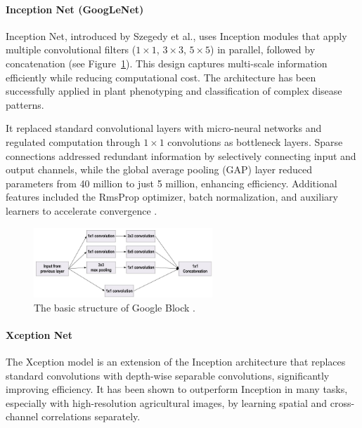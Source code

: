 \paragraph{Inception Net (GoogLeNet)}
Inception Net, introduced by Szegedy et al., uses Inception modules that apply multiple convolutional filters ($1 \times 1$, $3 \times 3$, $5 \times 5$) in parallel, followed by concatenation (see Figure~\ref{fig:figure09}). This design captures multi-scale information efficiently while reducing computational cost. The architecture has been successfully applied in plant phenotyping and classification of complex disease patterns.

It replaced standard convolutional layers with micro-neural networks and regulated computation through $1 \times 1$ convolutions as bottleneck layers. Sparse connections addressed redundant information by selectively connecting input and output channels, while the global average pooling (GAP) layer reduced parameters from 40 million to just 5 million, enhancing efficiency. Additional features included the RmsProp optimizer, batch normalization, and auxiliary learners to accelerate convergence \parencite{alzubaidi2021review}.



\begin{figure}[H] %
    \centering
    \includegraphics[width=0.6\textwidth]{chapters/chapter1/images/Figure09.png}
    \caption{The basic structure of Google Block \parencite{alzubaidi2021review}.}
    \label{fig:figure09}
\end{figure}

\paragraph{Xception Net}

The Xception model is an extension of the Inception architecture that replaces standard convolutions with depth-wise separable convolutions, significantly improving efficiency. It has been shown to outperform Inception in many tasks, especially with high-resolution agricultural images, by learning spatial and cross-channel correlations separately.


